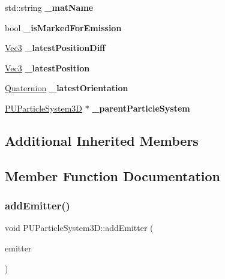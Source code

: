 \begin{DoxyCompactItemize}
std\+::string {\bfseries \+\_\+mat\+Name}
\item 
\mbox{\label{classPUParticleSystem3D_acdc9e9fbbe0a65991859923caaa7c4bd}} 
bool {\bfseries \+\_\+is\+Marked\+For\+Emission}
\item 
\mbox{\label{classPUParticleSystem3D_a8598e5009cde5f6c493c5f23b78c6278}} 
\hyperlink{classVec3}{Vec3} {\bfseries \+\_\+latest\+Position\+Diff}
\item 
\mbox{\label{classPUParticleSystem3D_a59538f02f92393038582d3e2159b382a}} 
\hyperlink{classVec3}{Vec3} {\bfseries \+\_\+latest\+Position}
\item 
\mbox{\label{classPUParticleSystem3D_a5e2f3b0b215c4f1280f18e760059b71d}} 
\hyperlink{classQuaternion}{Quaternion} {\bfseries \+\_\+latest\+Orientation}
\item 
\mbox{\label{classPUParticleSystem3D_ab60eccb10c690538fdfa7c8160b92deb}} 
\hyperlink{classPUParticleSystem3D}{P\+U\+Particle\+System3D} $\ast$ {\bfseries \+\_\+parent\+Particle\+System}
\end{DoxyCompactItemize}
\subsection*{Additional Inherited Members}


\subsection{Member Function Documentation}
\mbox{\label{classPUParticleSystem3D_aa317775b911d27623d6b7f61733f6a32}} 
\subsubsection{\texorpdfstring{add\+Emitter()}{addEmitter()}\hspace{0.1cm}{\footnotesize\ttfamily [1/2]}}
{\footnotesize\ttfamily void P\+U\+Particle\+System3\+D\+::add\+Emitter (\begin{DoxyParamCaption}\item[{\hyperlink{classPUEmitter}{P\+U\+Emitter} $\ast$}]{emitter }\end{DoxyParamCaption})}

